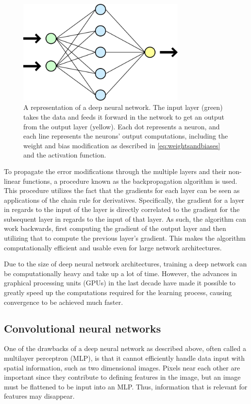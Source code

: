 \documentclass{kththesis}
\begin{document}
\begin{figure}
\centering
\includegraphics[width=0.75\textwidth]{dnn.png}
\caption{A representation of a deep neural network. The input layer (green) takes the data and feeds it forward in the network to get an output from the output layer (yellow). Each dot represents a neuron, and each line represents the neurons' output computations, including the weight and bias modification as described in \autoref{eq:weightsandbiases} and the activation function.}
\label{fig:dnn}
\end{figure}

To propagate the error modifications through the multiple layers and their non-linear functions, a procedure known as the backpropagation algorithm is used. This procedure utilizes the fact that the gradients for each layer can be seen as applications of the chain rule for derivatives. Specifically, the gradient for a layer in regards to the input of the layer is directly correlated to the gradient for the subsequent layer in regards to the input of that layer. As such, the algorithm can work backwards, first computing the gradient of the output layer and then utilizing that to compute the previous layer's gradient. This makes the algorithm computationally efficient and usable even for large network architectures. \parencite{Goodfellow-et-al-2016} 

Due to the size of deep neural network architectures, training a deep network can be computationally heavy and take up a lot of time. However, the advances in graphical processing units (GPUs) in the last decade have made it possible to greatly speed up the computations required for the learning process, causing convergence to be achieved much faster. \parencite{lecun2015deep}

\subsection{Convolutional neural networks}
One of the drawbacks of a deep neural network as described above, often called a multilayer perceptron (MLP), is that it cannot efficiently handle data input with spatial information, such as two dimensional images. Pixels near each other are important since they contribute to defining features in the image, but an image must be flattened to be input into an MLP. Thus, information that is relevant for features may disappear. 
\end{document}
